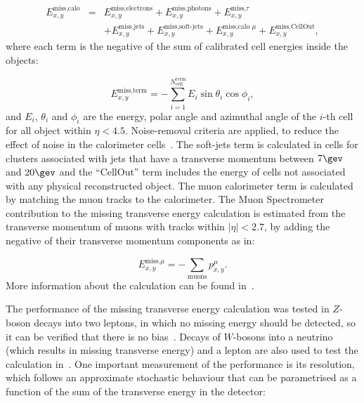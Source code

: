 \begin{eqnarray}
\displaystyle
E^{\textrm{miss,calo}}_{x,y}&=&E^{\textrm{miss,electrons}}_{x,y} + E^{\textrm{miss,photons}}_{x,y} + E^{\textrm{miss,}\tau}_{x,y} \nonumber \\
&& + E^{\textrm{miss,jets}}_{x,y} + E^{\textrm{miss,soft-jets}}_{x,y} + E^{\textrm{miss,calo }\mu}_{x,y} + E^{\textrm{miss,CellOut}}_{x,y},
\label{eq:met_calo}
\end{eqnarray}
where each term is the negative of the sum of calibrated cell energies inside the objects:

\begin{equation}
\displaystyle
E^{\textrm{miss,term}}_{x,y} = - \sum_{i=1}^{N_{\textrm{cell}}^{\textrm{term}}} E_i \sin \theta_i \cos \phi_i,
\label{eq:met_term}
\end{equation}
and $E_i$, $\theta_i$ and $\phi_i$ are the energy, polar angle and azimuthal angle of the $i$-th cell for all object within $\eta < 4.5$.
Noise-removal criteria are applied, to reduce the effect of noise in the calorimeter cells~\cite{atlas7met}. The soft-jets \met term is calculated in cells
for clusters associated with jets that have a transverse momentum between $7\gev$ and $20\gev$ and the ``CellOut'' term includes the energy of cells not associated with
any physical reconstructed object. The muon calorimeter term is calculated by matching the muon tracks to the calorimeter.
The Muon Spectrometer contribution to the missing transverse energy calculation is estimated from the transverse momentum of muons with tracks within $|\eta| < 2.7$, by
adding the negative of their transverse momentum components as in:

\begin{equation}
\displaystyle
E^{\textrm{miss,}\mu}_{x,y} = - \sum_{\textrm{muons}} p_{x,y}^{\mu}.
\label{eq:met_mu}
\end{equation}
More information about the \met calculation can be found in~\cite{atlas7met}.

The performance of the missing transverse energy calculation was tested in $Z$-boson decays into two leptons, in which no missing energy should be detected, so it can be
verified that there is no bias~\cite{atlas7met}. Decays of $W$-bosons into a neutrino (which results in missing transverse energy) and a lepton are also used to test the \met
calculation in~\cite{atlas7met}. One important measurement of the \met performance is its resolution, which follows an approximate stochastic behaviour that can
be parametrised as a function of the sum of the transverse
energy in the detector:

